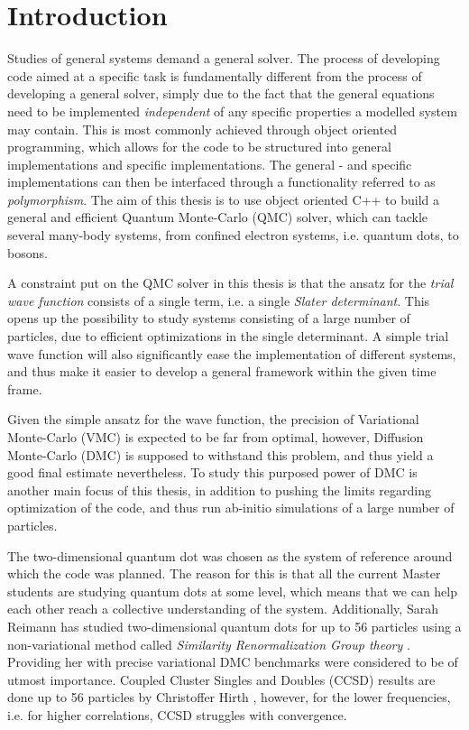 \chapter{Introduction}

Studies of general systems demand a general solver. The process of developing code aimed at a specific task is fundamentally different from the process of developing a general solver, simply due to the fact that the general equations need to be implemented \textit{independent} of any specific properties a modelled system may contain. This is most commonly achieved through object oriented programming, which allows for the code to be structured into general implementations and specific implementations. The general - and specific implementations can then be interfaced through a functionality referred to as \textit{polymorphism}. The aim of this thesis is to use object oriented C++ to build a general and efficient Quantum Monte-Carlo (QMC) solver, which can tackle several many-body systems, from confined electron systems, i.e. quantum dots, to bosons.  

A constraint put on the QMC solver in this thesis is that the ansatz for the \textit{trial wave function} consists of a single term, i.e. a single \textit{Slater determinant}. This opens up the possibility to study systems consisting of a large number of particles, due to efficient optimizations in the single determinant. A simple trial wave function will also  significantly ease the implementation of different systems, and thus make it easier to develop a general framework within the given time frame.

Given the simple ansatz for the wave function, the precision of Variational Monte-Carlo (VMC) is expected to be far from optimal, however, Diffusion Monte-Carlo (DMC) is supposed to withstand this problem, and thus yield a good final estimate nevertheless. To study this purposed power of DMC is another main focus of this thesis, in addition to pushing the limits regarding optimization of the code, and thus run ab-initio simulations of a large number of particles.

The two-dimensional quantum dot was chosen as the system of reference around which the code was planned. The reason for this is that all the current Master students are studying quantum dots at some level, which means that we can help each other reach a collective understanding of the system. Additionally, Sarah Reimann has studied two-dimensional quantum dots for up to 56 particles using a non-variational method called \textit{Similarity Renormalization Group theory} \cite{verdensBesteArtikkel}. Providing her with precise variational DMC benchmarks were considered to be of utmost importance. Coupled Cluster Singles and Doubles (CCSD) results are done up to 56 particles by Christoffer Hirth \cite{Hirth}, however, for the lower frequencies, i.e. for higher correlations, CCSD struggles with convergence.   


